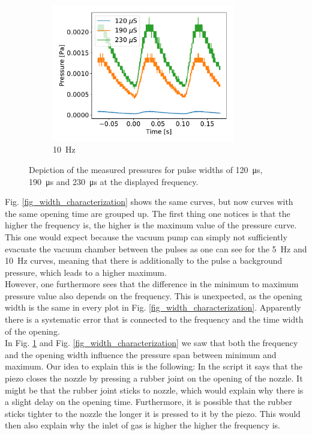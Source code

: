 \documentclass[a4paper,10pt]{article}
\begin{document}
\begin{figure}[H]
\begin{subfigure}[t]{0.45 \textwidth}
    \centering
    \includegraphics[height=6cm]{part1_10_hertz.pdf}
    \caption{\SI{10}{\hertz}}
  \end{subfigure}
  \caption{Depiction of the measured pressures for pulse widths of \SI{120}{\micro \s}, \SI{190}{\micro \s} and \SI{230}{\micro \s} at the displayed frequency. }
  \label{fig_pressure_characterization}
\end{figure}
Fig. \ref{fig_width_characterization} shows the same curves, but now curves with the same opening time are grouped up. The first thing one notices is that the higher the frequency is, the higher is the maximum value of the pressure curve. This one would expect because the vacuum pump can simply not sufficiently evacuate the vacuum chamber between the pulses as one can see for the \SI{5}{\hertz} and \SI{10}{\hertz} curves, meaning that there is additionally to the pulse a background pressure, which leads to a higher maximum. 
\\
However, one furthermore sees that the difference in the minimum to maximum pressure value also depends on the frequency. This is unexpected, as the opening width is the same in every plot in Fig. \ref{fig_width_characterization}. Apparently there is a systematic error that is connected to the frequency and the time width of the opening. %
\\
In Fig. \ref{fig_pressure_characterization} and Fig. \ref{fig_width_characterization} we saw that both the frequency and the opening width influence the pressure span between minimum and maximum. Our idea to explain this is the following: In the script \cite{script} it says that the piezo closes the nozzle by pressing a rubber joint on the opening of the nozzle. It might be that the rubber joint sticks to nozzle, which would explain why there is a slight delay on the opening time. Furthermore, it is possible that the rubber sticks tighter to the nozzle the longer it is pressed to it by the piezo. This would then also explain why the inlet of gas is higher the higher the frequency is. 
\end{document}

